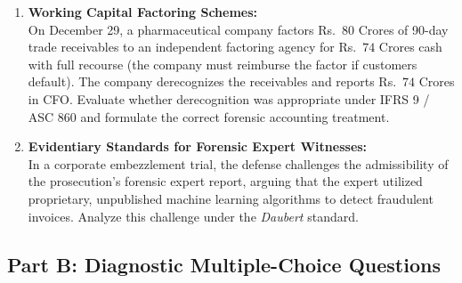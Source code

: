 \begin{enumerate}[label=\textbf{P3.\arabic*}]
    \item \textbf{Working Capital Factoring Schemes:}\\
    On December 29, a pharmaceutical company factors Rs.~$80$ Crores of 90-day trade receivables to an independent factoring agency for Rs.~$74$ Crores cash with full recourse (the company must reimburse the factor if customers default). The company derecognizes the receivables and reports Rs.~$74$ Crores in CFO. Evaluate whether derecognition was appropriate under IFRS 9 / ASC 860 and formulate the correct forensic accounting treatment.

    \item \textbf{Evidentiary Standards for Forensic Expert Witnesses:}\\
    In a corporate embezzlement trial, the defense challenges the admissibility of the prosecution's forensic expert report, arguing that the expert utilized proprietary, unpublished machine learning algorithms to detect fraudulent invoices. Analyze this challenge under the \textit{Daubert} standard.
\end{enumerate}

\subsection*{Part B: Diagnostic Multiple-Choice Questions}

